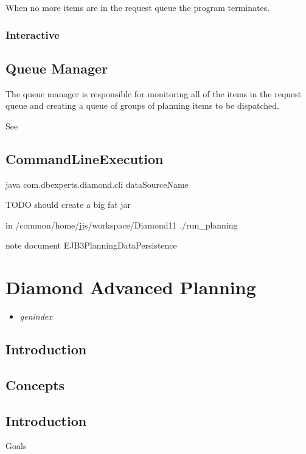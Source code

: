 \documentclass[letterpaper,10pt,english]{sphinxmanual}
\begin{document}
When no more items are in the request queue the program terminates.


\subsection{Interactive}
\label{APS/Technical:interactive}

\section{Queue Manager}
\label{APS/Technical:id1}
The queue manager is responsible for monitoring all of the items in the
request queue and creating a queue of groups of planning items to be
dispatched.

See


\section{CommandLineExecution}
\label{APS/Technical:commandlineexecution}
java com.dbexperts.diamond.cli dataSourceName

TODO should create a big fat jar

in /common/home/jjs/workspace/Diamond11 ./run\_planning

note document EJB3PlanningDataPersistence


\chapter{Diamond Advanced Planning}
\label{APS/index:diamond-advanced-planning}\label{APS/index::doc}\begin{itemize}
\item {} 
\emph{genindex}

\end{itemize}


\section{Introduction}
\label{APS/index:introduction}

\section{Concepts}
\label{APS/index:concepts}

\section{Introduction}
\label{APS/index:id1}
Goals
\end{document}
